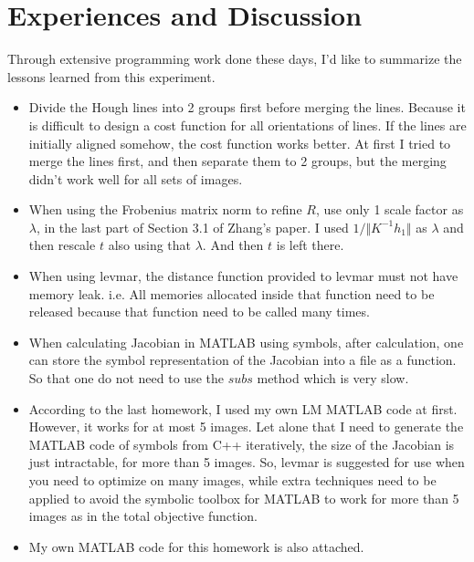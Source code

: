 \documentclass[12pt]{article}
\begin{document}
\section{Experiences and Discussion}
Through extensive programming work done these days, I'd like to summarize the lessons learned from this experiment.
\begin{itemize}
\item Divide the Hough lines into 2 groups first before merging the lines. Because it is difficult to design a cost function for all orientations of lines. If the lines are initially aligned somehow, the cost function works better. At first I tried to merge the lines first, and then separate them to 2 groups, but the merging didn't work well for all sets of images.
\item When using the Frobenius matrix norm to refine $R$, use only 1 scale factor as $\lambda$, in the last part of Section 3.1 of Zhang's paper. I used $1/\Vert K^{-1}h_1\Vert$ as $\lambda$ and then rescale $t$ also using that $\lambda$. And then $t$ is left there.
\item When using levmar, the distance function provided to levmar must not have memory leak. i.e. All memories allocated inside that function need to be released because that function need to be called many times.
\item When calculating Jacobian in MATLAB using symbols, after calculation, one can store the symbol representation of the Jacobian into a file as a function. So that one do not need to use the $subs$ method which is very slow.
\item According to the last homework, I used my own LM MATLAB code at first. However, it works for at most 5 images. Let alone that I need to generate the MATLAB code of symbols from C++ iteratively, the size of the Jacobian is just intractable, for more than 5 images. So, levmar is suggested for use when you need to optimize on many images, while extra techniques need to be applied to avoid the symbolic toolbox for MATLAB to work for more than 5 images as in the total objective function.
\item My own MATLAB code for this homework is also attached. %

\end{itemize}
\end{document}
